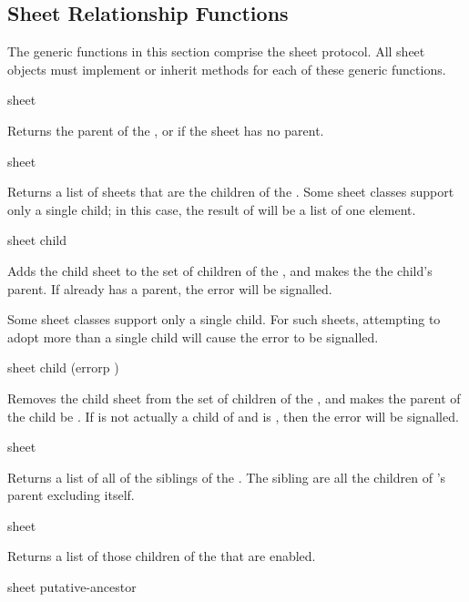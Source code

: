 \subsection {Sheet Relationship Functions}

The generic functions in this section comprise the sheet protocol.  All sheet
objects must implement or inherit methods for each of these generic functions.

 {sheet} 

Returns the parent of the  , or  if the sheet has
no parent.

 {sheet}

Returns a list of sheets that are the children of the  .
Some sheet classes support only a single child; in this case, the result of
 will be a list of one element.
\ReadOnly

 {sheet child}

Adds the child sheet  to the set of children of the 
, and makes the  the child's parent.  If 
already has a parent, the  error will be signalled.

Some sheet classes support only a single child.  For such sheets, attempting to
adopt more than a single child will cause the 
error to be signalled.

 {sheet child \key (errorp )}

Removes the child sheet  from the set of children of the 
, and makes the parent of the child be .  If  is
not actually a child of  and  is , then the
 error will be signalled.

 {sheet}

Returns a list of all of the siblings of the  .  The
sibling are all the children of 's parent excluding 
itself.
\FreshOutputs

 {sheet}

Returns a list of those children of the   that are enabled.
\FreshOutputs

 {sheet putative-ancestor}

